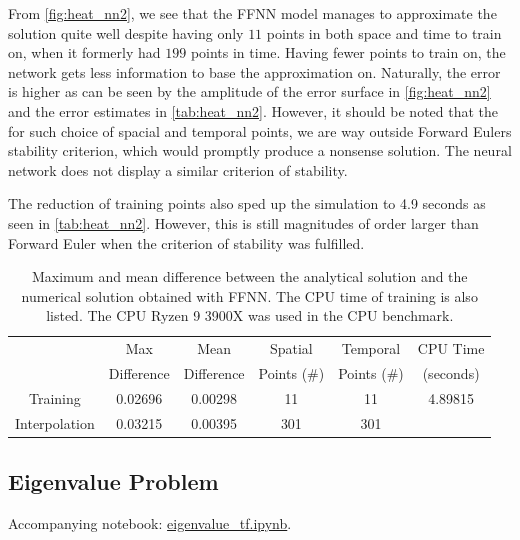 From \autoref{fig:heat_nn2}, we see that the FFNN model manages to approximate the solution quite well despite having only $11$ points in both space and time to train on, when it formerly had $199$ points in time. Having fewer points to train on, the network gets less information to base the approximation on. Naturally, the error is higher as can be seen by the amplitude of the error surface in \autoref{fig:heat_nn2} and the error estimates in \autoref{tab:heat_nn2}. However, it should be noted that the for such choice of spacial and temporal points, we are way outside Forward Eulers stability criterion, which would promptly produce a nonsense solution. The neural network does not display a similar criterion of stability. 

The reduction of training points also sped up the simulation to 4.9 seconds as seen in \autoref{tab:heat_nn2}. However, this is still magnitudes of order larger than Forward Euler when the criterion of stability was fulfilled. 

\begin{table}[H]
\caption{Maximum and mean difference between the analytical solution and the numerical solution obtained with FFNN. The CPU time of training is also listed. The CPU Ryzen 9 3900X was used in the CPU benchmark.}
\centering
{}
\begin{tabular}{cccccc}
\hline
\hline 
& Max & Mean & Spatial & Temporal & CPU Time
\\
& Difference & Difference & Points (\#) & Points (\#) & (seconds)
\\
\hline 
\hline 
Training & 0.02696 & 0.00298 & 11 & 11 & 4.89815
\\
Interpolation & 0.03215 & 0.00395 & 301 & 301 &
\\
\hline
\hline
\end{tabular}
\label{tab:heat_nn2}
\end{table}
\subsection{Eigenvalue Problem}\label{sec:eigenvalue results}

Accompanying notebook: \href{https://github.com/nicolossus/FYS-STK4155-Project3/blob/master/notebooks/eigenvalue_tf.ipynb}{eigenvalue\_tf.ipynb}.

